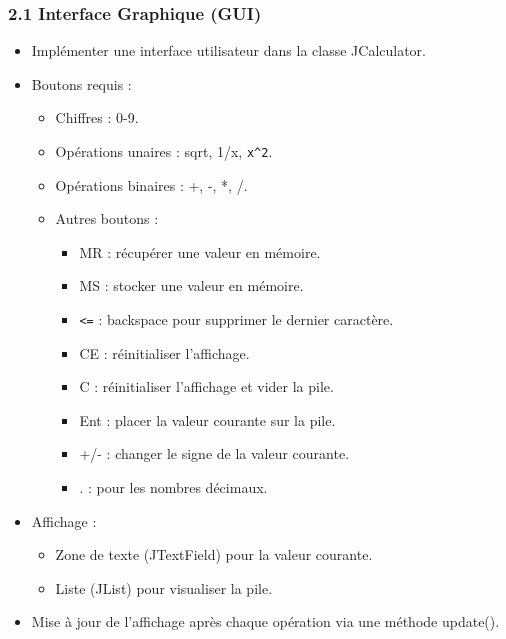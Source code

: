 \documentclass[12pt]{report}
\begin{document}
            \subsubsection*{2.1 Interface Graphique (GUI)}
                \begin{itemize}
                    \item Implémenter une interface utilisateur dans la classe JCalculator.
                    \item Boutons requis :
                    \begin{itemize}
                        \item Chiffres : 0-9.
                        \item Opérations unaires : sqrt, 1/x, \verb|x^2|.
                        \item Opérations binaires : +, -, *, /.
                        \item Autres boutons :
                        \begin{itemize}
                            \item MR : récupérer une valeur en mémoire.
                            \item MS : stocker une valeur en mémoire.
                            \item \verb|<=| : backspace pour supprimer le dernier caractère.
                            \item CE : réinitialiser l’affichage.
                            \item C : réinitialiser l’affichage et vider la pile.
                            \item Ent : placer la valeur courante sur la pile.
                            \item +/- : changer le signe de la valeur courante.
                            \item . : pour les nombres décimaux.
                        \end{itemize}
                    \end{itemize}

                    \item Affichage :
                    \begin{itemize}
                        \item Zone de texte (JTextField) pour la valeur courante.
                        \item Liste (JList) pour visualiser la pile.
                    \end{itemize}

                    \item Mise à jour de l'affichage après chaque opération via une méthode update().
                \end{itemize}
\end{document}
